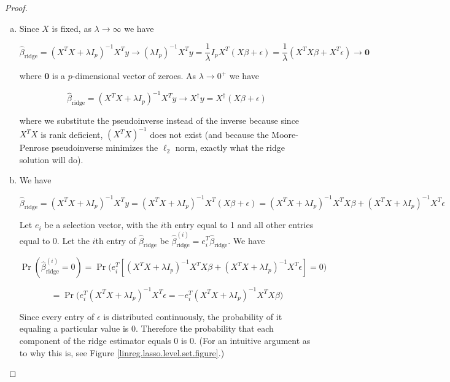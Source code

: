 \begin{proof}


\begin{enumerate}[(a)]

\item Since \(X\) is fixed, as \(\lambda \to \infty\) we have

\[
\hat{\beta}_{\text{ridge}} = (X^TX + \lambda I_p)^{-1}X^Ty \to (\lambda I_p)^{-1} X^Ty = \frac{1}{\lambda} I_p X^T(X \beta + \epsilon) = \frac{1}{\lambda} (X^TX \beta + X^T\epsilon)  \to \boldsymbol{0}
\]

where \(\boldsymbol{0}\) is a \(p\)-dimensional vector of zeroes. As \(\lambda \to 0^{+}\) we have

\[
\hat{\beta}_{\text{ridge}} = (X^TX + \lambda I_p)^{-1}X^Ty \to X^{\dagger}y = X^{\dagger}(X \beta + \epsilon)
\]


where we substitute the pseudoinverse instead of the inverse because since \(X^TX\) is rank deficient, \((X^TX)^{-1}\) does not exist (and because the Moore-Penrose pseudoinverse minimizes the \(\ell_2\) norm, exactly what the ridge solution will do). 


\item We have 

\[
\hat{\beta}_{\text{ridge}} = (X^TX + \lambda I_p)^{-1}X^Ty = (X^TX + \lambda I_p)^{-1}X^T(X \beta + \epsilon) = (X^TX + \lambda I_p)^{-1}X^TX \beta + (X^TX + \lambda I_p)^{-1}X^T  \epsilon
\]

Let \(e_i\) be a selection vector, with the \(i\)th entry equal to 1 and all other entries equal to 0. Let the \(i\)th entry of \(\hat{\beta}_{\text{ridge}} \) be \(\hat{\beta}_{\text{ridge}}^{(i)} = e_i^T \hat{\beta}_{\text{ridge}}  \). We have

\[
\Pr(\hat{\beta}_{\text{ridge}}^{(i)}  = 0) = \Pr \big( e_i^T  [(X^TX + \lambda I_p)^{-1}X^TX \beta + (X^TX + \lambda I_p)^{-1}X^T  \epsilon] = 0 \big)
\]

\[
= \Pr \big( e_i^T (X^TX + \lambda I_p)^{-1}X^T  \epsilon = -e_i^T  (X^TX + \lambda I_p)^{-1}X^TX \beta \big)
\]

Since every entry of \(\epsilon\) is distributed continuously, the probability of it equaling a particular value is 0. Therefore the probability that each component of the ridge estimator equals 0 is 0. (For an intuitive argument as to why this is, see Figure \ref{linreg.lasso.level.set.figure}.)

\end{enumerate}

\end{proof}

